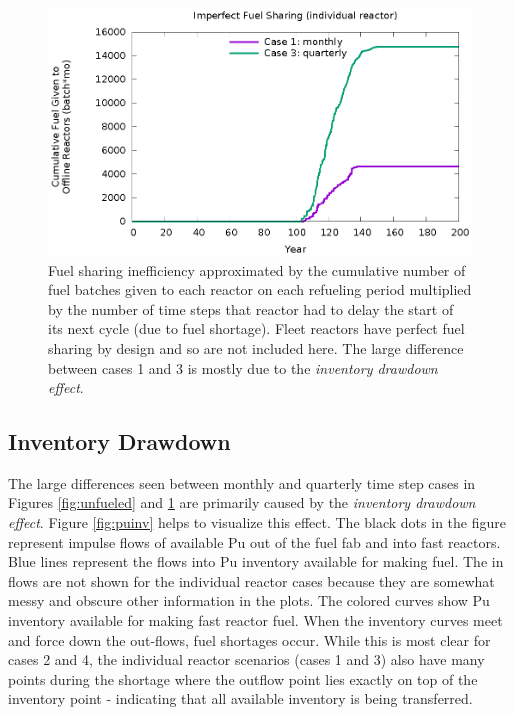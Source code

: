 \documentclass{style}
\begin{document}
\begin{figure}[!h]
    \centering
    \includegraphics[width=1.0\columnwidth]{exp2/badshare.eps}
    \caption[Cumulative unnecessary idling fuel]{
        Fuel sharing inefficiency approximated by the cumulative number of
        fuel batches given to each reactor on each refueling period multiplied
        by the number of time steps that reactor had to delay the start of its
        next cycle (due to fuel shortage).  Fleet reactors have perfect fuel
        sharing by design and so are not included here. The large difference
        between cases 1 and 3 is mostly due to the \emph{inventory drawdown
        effect}. 
    }
    \label{fig:badshare}
\end{figure}

\subsection{Inventory Drawdown}

The large differences seen between monthly and quarterly time step cases in
Figures \ref{fig:unfueled} and \ref{fig:badshare} are primarily caused by the
\emph{inventory drawdown effect}.  Figure \ref{fig:puinv} helps to visualize
this effect.  The black dots in the figure represent impulse flows of
available Pu out of the fuel fab and into fast reactors.  Blue lines represent
the flows into Pu inventory available for making fuel. The in flows are not
shown for the individual reactor cases because they are somewhat messy and
obscure other information in the plots. The colored curves show Pu inventory
available for making fast reactor fuel.  When the inventory curves meet and
force down the out-flows, fuel shortages occur.  While this is most clear for
cases 2 and 4, the individual reactor scenarios (cases 1 and 3) also have many
points during the shortage where the outflow point lies exactly on top of the
inventory point - indicating that all available inventory is being
transferred.
\end{document}

